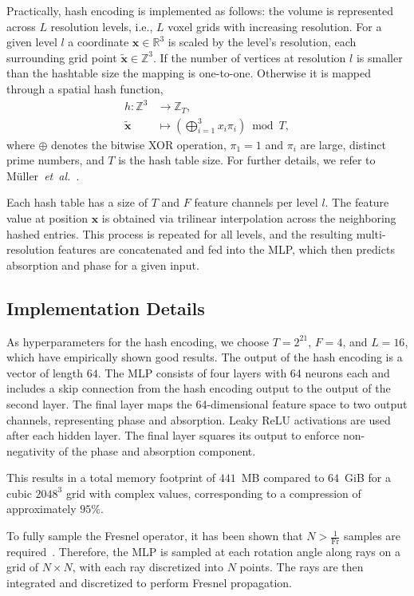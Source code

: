 \documentclass{article}
\begin{document}
Practically, hash encoding is implemented as follows:  
the volume is represented across $L$ resolution levels, i.e., $L$ voxel grids with increasing resolution.  
For a given level $l$ a coordinate $\mathbf{x} \in \mathbb{R}^{3}$ is scaled by the level's resolution, each surrounding grid point $\tilde{\mathbf{x}} \in \mathbb{Z}^{3}$.
If the number of vertices at resolution $l$ is smaller than the hashtable size the mapping is one-to-one.
Otherwise it is mapped through a spatial hash function,
\begin{align}
	h : \mathbb{Z}^{3} &\rightarrow \mathbb{Z}_{T}, \\
	\tilde{\mathbf{x}} &\mapsto \left( \bigoplus_{i=1}^{3} x_{i} \pi_{i} \right) \bmod T,
\end{align}
where $\oplus$ denotes the bitwise XOR operation, $\pi_{1}=1$ and $\pi_{i}$ are large, distinct prime numbers, and $T$ is the hash table size.  
For further details, we refer to Müller~\textit{et~al.}~\cite{mullerInstantNeuralGraphics2022}.  

Each hash table has a size of $T$ and $F$ feature channels per level $l$.  
The feature value at position $\mathbf{x}$ is obtained via trilinear interpolation across the neighboring hashed entries.  
This process is repeated for all levels, and the resulting multi-resolution features are concatenated and fed into the MLP, which then predicts absorption and phase for a given input.

\subsection{Implementation Details}
As hyperparameters for the hash encoding, we choose $T = 2^{21}$, $F = 4$, and $L = 16$, which have empirically shown good results.  
The output of the hash encoding is a vector of length $64$.  
The MLP consists of four layers with 64 neurons each and includes a skip connection from the hash encoding output to the output of the second layer.  
The final layer maps the 64-dimensional feature space to two output channels, representing phase and absorption.  
Leaky ReLU activations are used after each hidden layer.  
The final layer squares its output to enforce non-negativity of the phase and absorption component.  

This results in a total memory footprint of $441$~MB compared to $64$~GiB for a cubic $2048^3$ grid with complex values, corresponding to a compression of approximately $95\%$.  

To fully sample the Fresnel operator, it has been shown that $N > \frac{1}{\mathrm{Fr}}$ samples are required~\cite{paganinCoherentXrayOptics2006a}.  
Therefore, the MLP is sampled at each rotation angle along rays on a grid of $N \times N$, with each ray discretized into $N$ points.  
The rays are then integrated and discretized to perform Fresnel propagation.  
\end{document}
